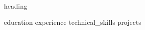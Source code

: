 \documentclass[letterpaper,11pt]{article}
\begin{document}
{heading}

\justifying
{education}
{experience}
{technical_skills}
{projects}

\end{document}
